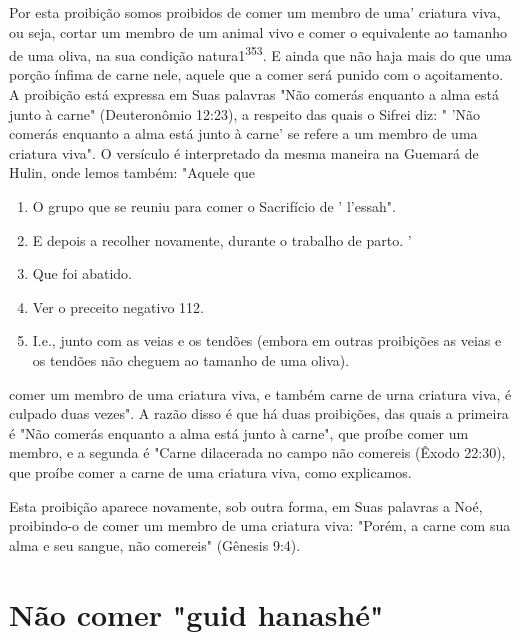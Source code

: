 \begin{itemize}
\begin{enumrate}
\begin{itemize}
\begin{itemize}
\begin{itemize}
Por esta proibição somos proibidos de comer um membro de uma' criatura
viva, ou seja, cortar um membro de um animal vivo e comer o equi­valente
ao tamanho de uma oliva, na sua condição natura1\textsuperscript{353}. E
ainda que não haja mais do que uma porção ínfima de carne nele, aquele
que a comer será punido com o açoitamento. A proibição está expressa em
Suas palavras "Não comerás enquanto a alma está junto à carne"
(Deuteronômio 12:23), a respei­to das quais o Sifrei diz: " 'Não comerás
enquanto a alma está junto à carne' se refere a um membro de uma
criatura viva". O versículo é interpretado da mesma maneira na Guemará
de Hulin, onde lemos também: "Aquele que


\begin{enumerate}
\def\labelenumi{\arabic{enumi}.}
\setcounter{enumi}{348}
\item
 
 O grupo que se reuniu para comer o Sacrifício de ' l'essah".
 
\item
 
 E depois a recolher novamente, durante o trabalho de parto. '
 
\item
 
 Que foi abatido.
 
\item
 
 Ver o preceito negativo 112.
 
\item
 
 I.e., junto com as veias e os tendões (embora em outras proibições as
 veias e os tendões não cheguem ao tamanho de uma oliva).
 
\end{enumerate}



comer um membro de uma criatura viva, e também carne de urna criatura
vi­va, é culpado duas vezes". A razão disso é que há duas proibições,
das quais a primeira é "Não comerás enquanto a alma está junto à carne",
que proíbe comer um membro, e a segunda é "Carne dilacerada no campo não
come­reis (Êxodo 22:30), que proíbe comer a carne de uma criatura viva,
como explicamos.

Esta proibição aparece novamente, sob outra forma, em Suas pala­vras a
Noé, proibindo-o de comer um membro de uma criatura viva: "Porém, a
carne com sua alma e seu sangue, não comereis" (Gênesis 9:4).

\section{Não comer "guid hanashé"}


\end{itemize}
\end{itemize}
\end{itemize}
\end{enumrate}
\end{itemize}
